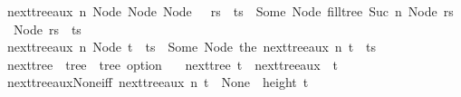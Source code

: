 \begin{isabellebody}
{\isacharbar}{\kern0pt}\ {\isachardoublequoteopen}next{\isacharunderscore}{\kern0pt}tree{\isacharunderscore}{\kern0pt}aux\ n\ {\isacharparenleft}{\kern0pt}Node\ {\isacharparenleft}{\kern0pt}Node\ {\isacharparenleft}{\kern0pt}Node\ {\isacharbrackleft}{\kern0pt}{\isacharbrackright}{\kern0pt}\ {\isacharhash}{\kern0pt}\ rs{\isacharparenright}{\kern0pt}\ {\isacharhash}{\kern0pt}\ ts{\isacharparenright}{\kern0pt}{\isacharparenright}{\kern0pt}\ {\isacharequal}{\kern0pt}\ Some\ {\isacharparenleft}{\kern0pt}Node\ {\isacharparenleft}{\kern0pt}fill{\isacharunderscore}{\kern0pt}tree\ {\isacharparenleft}{\kern0pt}Suc\ n{\isacharparenright}{\kern0pt}\ {\isacharparenleft}{\kern0pt}Node\ rs{\isacharparenright}{\kern0pt}\ {\isacharat}{\kern0pt}\ {\isacharparenleft}{\kern0pt}Node\ rs{\isacharparenright}{\kern0pt}\ {\isacharhash}{\kern0pt}\ ts{\isacharparenright}{\kern0pt}{\isacharparenright}{\kern0pt}{\isachardoublequoteclose}\isanewline
{\isacharbar}{\kern0pt}\ {\isachardoublequoteopen}next{\isacharunderscore}{\kern0pt}tree{\isacharunderscore}{\kern0pt}aux\ n\ {\isacharparenleft}{\kern0pt}Node\ {\isacharparenleft}{\kern0pt}t\ {\isacharhash}{\kern0pt}\ ts{\isacharparenright}{\kern0pt}{\isacharparenright}{\kern0pt}\ {\isacharequal}{\kern0pt}\ Some\ {\isacharparenleft}{\kern0pt}Node\ {\isacharparenleft}{\kern0pt}the\ {\isacharparenleft}{\kern0pt}next{\isacharunderscore}{\kern0pt}tree{\isacharunderscore}{\kern0pt}aux\ n\ t{\isacharparenright}{\kern0pt}\ {\isacharhash}{\kern0pt}\ ts{\isacharparenright}{\kern0pt}{\isacharparenright}{\kern0pt}{\isachardoublequoteclose}\isanewline
\isanewline
{}\isamarkupfalse%
\ next{\isacharunderscore}{\kern0pt}tree\ {\isacharcolon}{\kern0pt}{\isacharcolon}{\kern0pt}\ {\isachardoublequoteopen}tree\ {\isasymRightarrow}\ tree\ option{\isachardoublequoteclose}\ \isanewline
\ \ {\isachardoublequoteopen}next{\isacharunderscore}{\kern0pt}tree\ t\ {\isacharequal}{\kern0pt}\ next{\isacharunderscore}{\kern0pt}tree{\isacharunderscore}{\kern0pt}aux\ {}\ t{\isachardoublequoteclose}\isanewline
\isanewline
\isanewline
{}\isamarkupfalse%
\ next{\isacharunderscore}{\kern0pt}tree{\isacharunderscore}{\kern0pt}aux{\isacharunderscore}{\kern0pt}None{\isacharunderscore}{\kern0pt}iff{\isacharcolon}{\kern0pt}\ {\isachardoublequoteopen}next{\isacharunderscore}{\kern0pt}tree{\isacharunderscore}{\kern0pt}aux\ n\ t\ {\isacharequal}{\kern0pt}\ None\ {\isasymlongleftrightarrow}\ height\ t\ {\isacharless}{\kern0pt}\ {}{\isachardoublequoteclose}\isanewline
%
\isadelimproof
%
\endisadelimproof
%
\isatagproof

\end{isabellebody}
